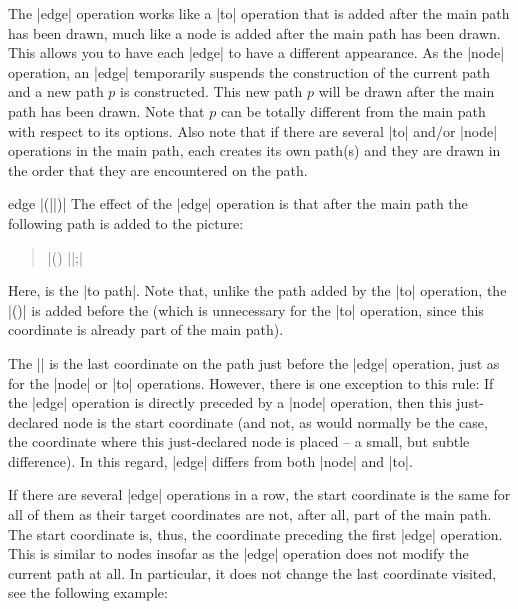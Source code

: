 \label{section-nodes-edges}

The |edge| operation works like a |to| operation that is added after
the main path has been drawn, much like a node is added after the main
path has been drawn. This allows you to have each |edge| to have a
different appearance. As the |node| operation, an |edge| temporarily
suspends the construction of the current path and a new path $p$ is
constructed. This new path $p$ will be drawn after the main path has
been drawn. Note that $p$ can be totally different from the main
path with respect to its options. Also note that if there are
several |to| and/or |node| operations in the main path, each
creates its own path(s) and they are drawn in the order that they
are encountered on the path.

\begin{pathoperation}{edge}{
     |(||)|}
  The effect of the |edge| operation is that after the main path the
  following path is added to the picture:
  \begin{quote}
    | (\tikztostart) ||;|
  \end{quote}
  Here,  is the |to path|. Note that, unlike the path added
  by the |to| operation, the |(\tikztostart)| is added before the
   (which is unnecessary for the |to| operation, since this
  coordinate is already part of the main path).

  The |\tikztostart| is the last coordinate on the path just before
  the |edge| operation, just as for the |node| or |to| operations.
  However, there is one exception to this rule: If the |edge|
  operation is directly preceded by a |node| operation, then this
  just-declared node is the start coordinate (and not, as would
  normally be the case, the coordinate where this just-declared node
  is placed -- a small, but subtle difference). In this regard, |edge|
  differs from both |node| and |to|.

  If there are several |edge| operations in a row, the start coordinate
  is the same for all of them as their target coordinates are not,
  after all, part of the main path. The start coordinate is, thus, the
  coordinate preceding the first |edge| operation. This is
  similar to nodes insofar as the |edge| operation does not modify the
  current path at all. In particular, it does not change the last
  coordinate visited, see the following example:

\begin{codeexample}[]
\end{codeexample}


\end{pathoperation}
